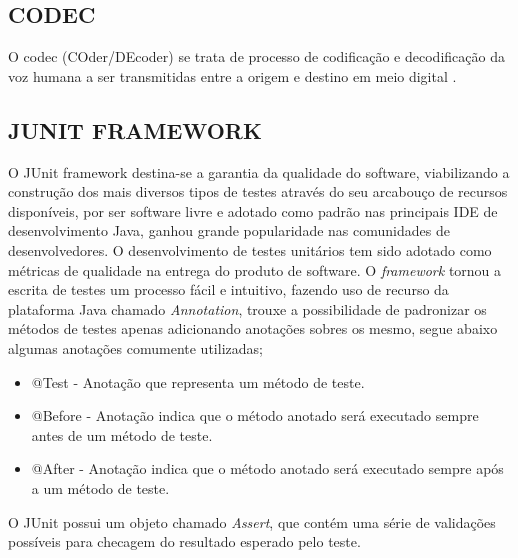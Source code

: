 \subsection{\textbf{\uppercase{Codec}}}
O codec (COder/DEcoder) se trata de processo de codificação e decodificação da voz humana a ser transmitidas entre a origem e destino em meio digital \cite{VIEIRA:2007}.

\subsection{\textbf{\uppercase{JUnit Framework}}}
O JUnit framework destina-se a garantia da qualidade do software, viabilizando a construção dos mais diversos tipos de testes através do seu arcabouço de recursos disponíveis, por ser software livre e adotado como padrão nas principais IDE de desenvolvimento Java, ganhou grande popularidade nas comunidades de desenvolvedores. O desenvolvimento de testes unitários tem sido adotado como métricas de qualidade na entrega do produto de software.
O \textit{framework} tornou a escrita de testes um processo fácil e intuitivo, fazendo uso de recurso da plataforma Java chamado \textit{Annotation}\label{key:annotation}, trouxe a possibilidade de padronizar os métodos de testes apenas adicionando anotações sobres os mesmo, segue abaixo algumas anotações comumente utilizadas;

\begin{itemize}
	\item @Test - Anotação que representa um método de teste.
	\item @Before - Anotação indica que o método anotado será executado sempre antes de um método de teste.
 	\item @After - Anotação indica que o método anotado será executado sempre após a um método de teste.
\end{itemize}

O JUnit possui um objeto chamado \textit{Assert}, que contém uma série de validações possíveis para checagem do resultado esperado pelo teste.
